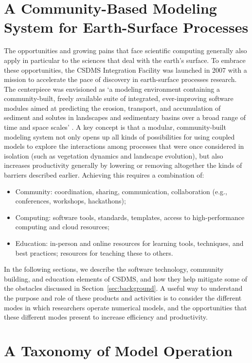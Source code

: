 \documentclass[12pt]{amsart}
\begin{document}
\section{A Community-Based Modeling System for Earth-Surface Processes}
\label{sec:csdms}

The opportunities and growing pains that face scientific computing generally also apply in particular to the sciences that deal with the earth's surface. To embrace these opportunities, the CSDMS Integration Facility was launched in 2007 with a mission to accelerate the pace of discovery in earth-surface processes research. The centerpiece was envisioned as `a modeling environment containing a community-built, freely available suite of integrated, ever-improving software modules aimed at predicting the erosion, transport, and accumulation of sediment and solutes in landscapes and sedimentary basins over a broad range of time and space scales' \citep{anderson2004community}. A key concept is that a modular, community-built modeling system not only opens up all kinds of possibilities for using coupled models to explore the interactions among processes that were once considered in isolation (such as vegetation dynamics and landscape evolution), but also increases productivity generally by lowering or removing altogether the kinds of barriers described earlier. Achieving this requires a combination of:
\begin{itemize}
\item
Community: coordination, sharing, communication, collaboration (e.g., conferences, workshops, hackathons);
\item
Computing: software tools, standards, templates, access to high-performance computing and cloud resources;
\item
Education: in-person and online resources for learning tools, techniques, and best practices; resources for teaching these to others.
\end{itemize}
In the following sections, we describe the software technology, community building, and education elements of CSDMS, and how they help mitigate some of the obstacles discussed in Section~\ref{sec:background}. A useful way to understand the purpose and role of these products and activities is to consider the different modes in which researchers operate numerical models, and the opportunities that these different modes present to increase efficiency and productivity.


\section{A Taxonomy of Model Operation}
\label{sec:taxonomy}
\end{document}
